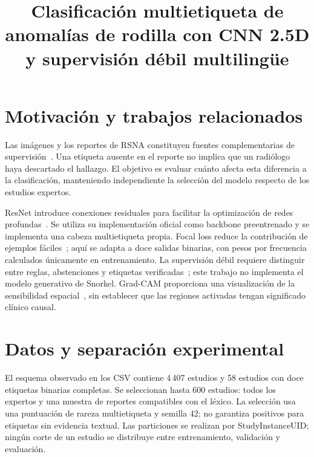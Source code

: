 
\title{Clasificación multietiqueta de anomalías de rodilla con CNN 2.5D y supervisión débil multilingüe}

\maketitle
\begin{abstract}

\end{abstract}

\section{Motivación y trabajos relacionados}
Las imágenes y los reportes de RSNA constituyen fuentes complementarias de supervisión~\cite{rsna}.
Una etiqueta ausente en el reporte no implica que un radiólogo haya descartado el hallazgo.
El objetivo es evaluar cuánto afecta esta diferencia a la clasificación, manteniendo independiente
la selección del modelo respecto de los estudios expertos.

ResNet introduce conexiones residuales para facilitar la optimización de redes profundas~\cite{resnet}.
Se utiliza su implementación oficial como backbone preentrenado y se implementa una cabeza multietiqueta propia.
Focal loss reduce la contribución de ejemplos fáciles~\cite{focal}; aquí se adapta a doce salidas binarias,
con pesos por frecuencia calculados únicamente en entrenamiento. La supervisión débil requiere distinguir
entre reglas, abstenciones y etiquetas verificadas~\cite{snorkel}; este trabajo no implementa el modelo generativo
de Snorkel. Grad-CAM proporciona una visualización de la sensibilidad espacial~\cite{gradcam},
sin establecer que las regiones activadas tengan significado clínico causal.

\section{Datos y separación experimental}


El esquema observado en los CSV contiene 4\,407 estudios y 58 estudios con doce etiquetas binarias completas.
Se seleccionan hasta 600 estudios: todos los expertos y una muestra de reportes compatibles con el léxico.
La selección usa una puntuación de rareza multietiqueta y semilla 42; no garantiza positivos para etiquetas
sin evidencia textual. Las particiones se realizan por StudyInstanceUID; ningún corte de un estudio
se distribuye entre entrenamiento, validación y evaluación.

